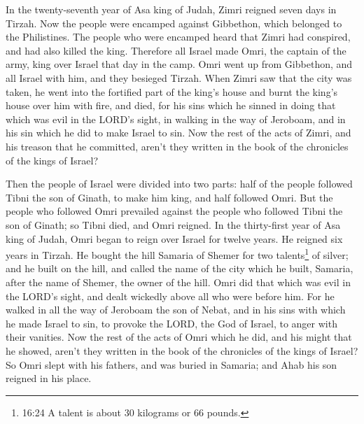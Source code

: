  In the twenty-seventh year of Asa king of Judah, Zimri
reigned seven days in Tirzah. Now the people were encamped against
Gibbethon, which belonged to the Philistines.  The people
who were encamped heard that Zimri had conspired, and had also killed
the king. Therefore all Israel made Omri, the captain of the army, king
over Israel that day in the camp.  Omri went up from
Gibbethon, and all Israel with him, and they besieged Tirzah.
 When Zimri saw that the city was taken, he went into the
fortified part of the king's house and burnt the king's house over him
with fire, and died,  for his sins which he sinned in doing
that which was evil in the LORD's sight, in walking in the way of
Jeroboam, and in his sin which he did to make Israel to sin.
 Now the rest of the acts of Zimri, and his treason that he
committed, aren't they written in the book of the chronicles of the
kings of Israel?

 Then the people of Israel were divided into two parts:
half of the people followed Tibni the son of Ginath, to make him king,
and half followed Omri.  But the people who followed Omri
prevailed against the people who followed Tibni the son of Ginath; so
Tibni died, and Omri reigned.  In the thirty-first year of
Asa king of Judah, Omri began to reign over Israel for twelve years. He
reigned six years in Tirzah.  He bought the hill Samaria of
Shemer for two talents\footnote{16:24 A talent is about 30 kilograms or
  66 pounds.} of silver; and he built on the hill, and called the name
of the city which he built, Samaria, after the name of Shemer, the owner
of the hill.  Omri did that which was evil in the LORD's
sight, and dealt wickedly above all who were before him. 
For he walked in all the way of Jeroboam the son of Nebat, and in his
sins with which he made Israel to sin, to provoke the LORD, the God of
Israel, to anger with their vanities.  Now the rest of the
acts of Omri which he did, and his might that he showed, aren't they
written in the book of the chronicles of the kings of Israel?
 So Omri slept with his fathers, and was buried in Samaria;
and Ahab his son reigned in his place.

